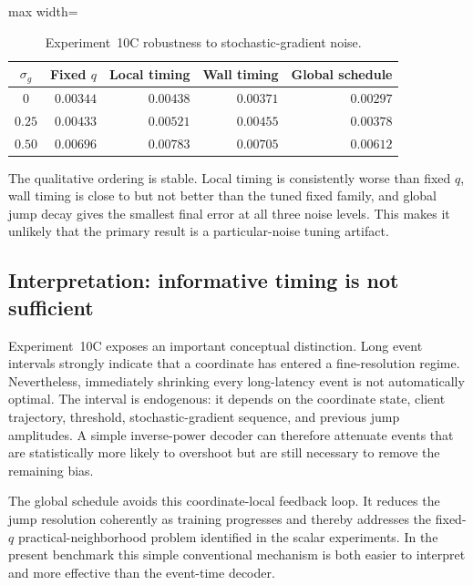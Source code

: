 \begin{table}[ht]
  \centering
  \small
  \caption{Experiment~10C robustness to stochastic-gradient noise.}
  \label{tab:exp10c_noise}
  \begin{adjustbox}{max width=\textwidth}
\begin{tabular}{crrrr}
    \toprule
    $\sigma_g$ & Fixed $q$ & Local timing & Wall timing & Global schedule \\
    \midrule
    $0$ & $0.00344$ & $0.00438$ & $0.00371$ & $\mathbf{0.00297}$ \\
    $0.25$ & $0.00433$ & $0.00521$ & $0.00455$ & $\mathbf{0.00378}$ \\
    $0.50$ & $0.00696$ & $0.00783$ & $0.00705$ & $\mathbf{0.00612}$ \\
    \bottomrule
  \end{tabular}
\end{adjustbox}
\end{table}

The qualitative ordering is stable. Local timing is consistently worse than fixed $q$, wall timing is close to but not better than the tuned fixed family, and global jump decay gives the smallest final error at all three noise levels. This makes it unlikely that the primary result is a particular-noise tuning artifact.

\subsection{Interpretation: informative timing is not sufficient}

Experiment~10C exposes an important conceptual distinction. Long event intervals strongly indicate that a coordinate has entered a fine-resolution regime. Nevertheless, immediately shrinking every long-latency event is not automatically optimal. The interval is endogenous: it depends on the coordinate state, client trajectory, threshold, stochastic-gradient sequence, and previous jump amplitudes. A simple inverse-power decoder can therefore attenuate events that are statistically more likely to overshoot but are still necessary to remove the remaining bias.

The global schedule avoids this coordinate-local feedback loop. It reduces the jump resolution coherently as training progresses and thereby addresses the fixed-$q$ practical-neighborhood problem identified in the scalar experiments. In the present benchmark this simple conventional mechanism is both easier to interpret and more effective than the event-time decoder.

